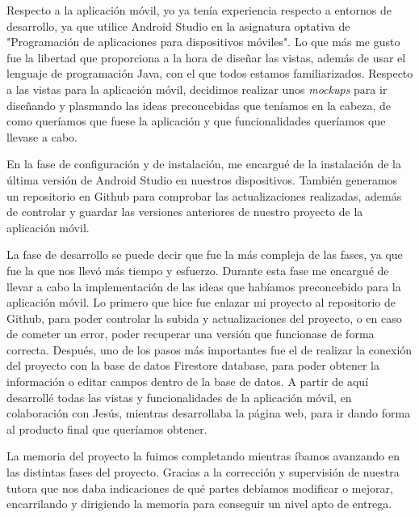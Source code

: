 Respecto a la aplicación móvil, yo ya tenía experiencia respecto a entornos de desarrollo, ya que utilice Android Studio en la asignatura optativa de "Programación de aplicaciones para dispositivos móviles". Lo que más me gusto fue la libertad que proporciona a la hora de diseñar las vistas, además de usar el lenguaje de programación Java, con el que todos estamos familiarizados. Respecto a las vistas para la aplicación móvil, decidimos realizar unos \textit{mockups} para ir diseñando y plasmando las ideas preconcebidas que teníamos en la cabeza, de como queríamos que fuese la aplicación y que funcionalidades queríamos que llevase a cabo.

En la fase de configuración y de instalación, me encargué de la instalación de la última versión de Android Studio en nuestros dispositivos. También generamos un repositorio en Github para comprobar las actualizaciones realizadas, además de controlar y guardar las versiones anteriores de nuestro proyecto de la aplicación móvil.

La fase de desarrollo se puede decir que fue la más compleja de las fases, ya que fue la que nos llevó más tiempo y esfuerzo. Durante esta fase me encargué de llevar a cabo la implementación de las ideas que habíamos preconcebido para la aplicación móvil. Lo primero que hice fue enlazar mi proyecto al repositorio de Github, para poder controlar la subida y actualizaciones del proyecto, o en caso de cometer un error, poder recuperar una versión que funcionase de forma correcta.
Después, uno de los pasos más importantes fue el de realizar la conexión del proyecto con la base de datos Firestore database, para poder obtener la información o editar campos dentro de la base de datos. A partir de aquí desarrollé todas las vistas y funcionalidades de la aplicación móvil, en colaboración con Jesús, mientras desarrollaba la página web, para ir dando forma al producto final que queríamos obtener.

La memoria del proyecto la fuimos completando mientras íbamos avanzando en las distintas fases del proyecto. Gracias a la corrección y supervisión de nuestra tutora que nos daba indicaciones de qué partes debíamos modificar o mejorar, encarrilando y dirigiendo la memoria para conseguir un nivel apto de entrega. 



